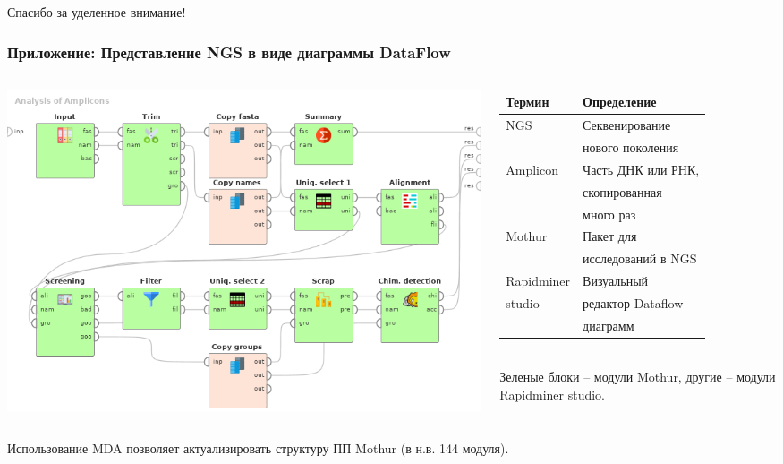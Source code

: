 \documentclass[10pt]{beamer}
\begin{document}
\begin{frame}
  \begin{center}
  \Large Спасибо за уделенное внимание!
\end{center}
\end{frame}

\begin{frame}
  \frametitle{Приложение: Представление NGS в виде диаграммы DataFlow}
  \begin{columns}
    \begin{column}{0.6\textwidth}
      \begin{raggedright}
        \includegraphics[width=1\linewidth]{Dataflow-color-en.png}
      \end{raggedright}
    \end{column}
    \begin{column}{0.4\textwidth}\footnotesize
      \begin{tabular}{ll}
        Термин & Определение \\
        \hline
        NGS & Секвенирование \\ & нового поколения\\
        Amplicon & Часть ДНК или РНК, \\
               & скопированная  \\
               & много раз \\
        Mothur & Пакет для\\ & исследований в NGS \\
        Rapidminer & Визуальный \\
        studio     & редактор Dataflow-\\
             & диаграмм
      \end{tabular}
      ${}$\\[1em]
      Зеленые блоки -- модули Mothur, другие -- модули Rapidminer studio.
    \end{column}
  \end{columns}
  \vspace{1em}
  Использование MDA позволяет актуализировать структуру ПП Mothur (в н.в. 144 модуля).
\end{frame}
\end{document}
